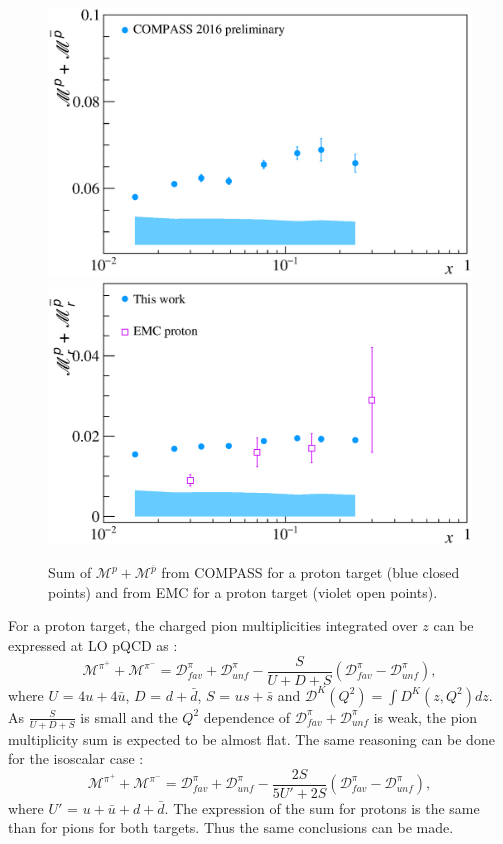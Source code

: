 \begin{figure}[!h]
  \centering
	\includegraphics[scale=0.5]{./gfx/Mult_p_sum.eps}
	\includegraphics[scale=0.5]{./gfx/Mult_p_sum_EMC.eps}
	\caption{Sum of $\mathscr{M}^{p}+\mathscr{M}^{\overline{p}}$ from COMPASS for a proton target (blue closed points) and from EMC for a proton target (violet open points).}
	\label{pic:psum}
\end{figure}

For a proton target, the charged pion multiplicities integrated over $z$ can be expressed at LO pQCD as :
%
\begin{equation}\label{eq:pisum}
  \mathscr{M}^{\pi^+}+\mathscr{M}^{\pi^-} = \mathscr{D}^{\pi}_{fav} + \mathscr{D}^{\pi}_{unf} - \frac{S}{U+D+S} \left( \mathscr{D}^{\pi}_{fav} - \mathscr{D}^{\pi}_{unf} \right),
\end{equation}
%
where $U$ = $4u+4\bar{u}$, $D$ = $d+\bar{d}$, $S$ = $us+\bar{s}$ and $\mathscr{D}^K(Q^2) = \int D^K(z,Q^2) dz $. As $\frac{S}{U+D+S}$ is small and the $Q^2$ dependence of $\mathscr{D}^{\pi}_{fav} + \mathscr{D}^{\pi}_{unf}$ is weak, the pion multiplicity sum is expected to be almost flat. The same reasoning can be done for the isoscalar case :
%
\begin{equation}
  \mathscr{M}^{\pi^+}+\mathscr{M}^{\pi^-} = \mathscr{D}^{\pi}_{fav} + \mathscr{D}^{\pi}_{unf} - \frac{2S}{5U'+2S} \left( \mathscr{D}^{\pi}_{fav} - \mathscr{D}^{\pi}_{unf} \right),
\end{equation}
%
where $U'$ = $u+\bar{u}+d+\bar{d}$. The expression of the sum for protons is the same than for pions for both targets. Thus the same conclusions can be made.

